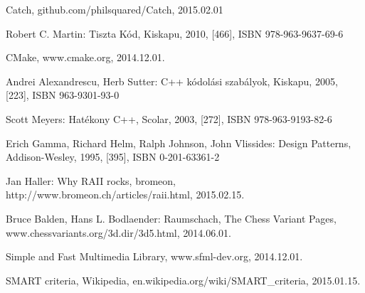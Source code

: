 \documentclass[12pt, twoside]{report}
\begin{document}
\begin{thebibliography}{CMake}
	 Catch, github.com/philsquared/Catch, 2015.02.01
			
	 Robert C. Martin: Tiszta Kód, Kiskapu, 2010, [466], ISBN 978-963-9637-69-6

	 CMake, www.cmake.org, 2014.12.01.
	
	 Andrei Alexandrescu, Herb Sutter: C++ kódolási szabályok, Kiskapu, 2005, [223], ISBN 963-9301-93-0
	
	 Scott Meyers: Hatékony C++, Scolar, 2003, [272], ISBN 978-963-9193-82-6
	
	 Erich Gamma, Richard Helm, Ralph Johnson, John Vlissides: Design Patterns, Addison-Wesley, 1995, [395], ISBN 0-201-63361-2
	
	 Jan Haller: Why RAII rocks, bromeon, http://www.bromeon.ch/articles/raii.html, 2015.02.15.
	
	 Bruce Balden, Hans L. Bodlaender: Raumschach, The Chess Variant Pages, www.chessvariants.org/3d.dir/3d5.html, 2014.06.01.
		
	 Simple and Fast Multimedia Library, www.sfml-dev.org, 2014.12.01.
	
	 SMART criteria, Wikipedia, en.wikipedia.org/wiki/SMART\_criteria, 2015.01.15.
\end{thebibliography}
\end{document}
